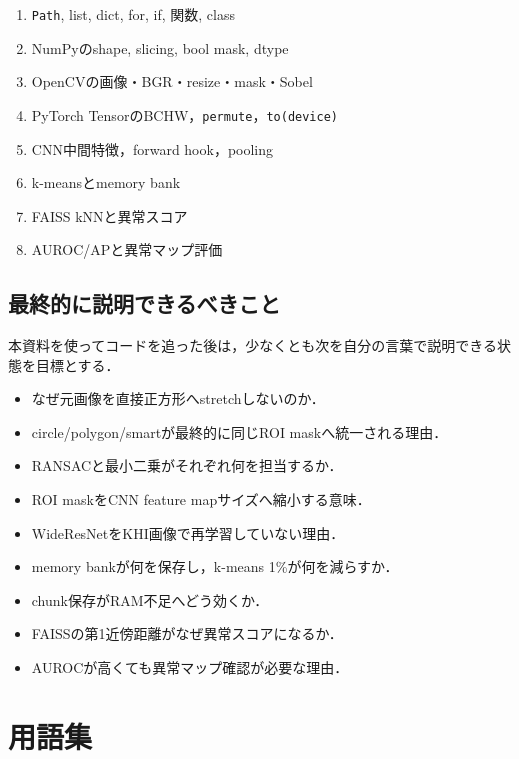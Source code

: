 \documentclass[a4paper,11pt]{ltjsreport}
\begin{document}
\begin{enumerate}
\item \texttt{Path}, list, dict, for, if, 関数, class
\item NumPyのshape, slicing, bool mask, dtype
\item OpenCVの画像・BGR・resize・mask・Sobel
\item PyTorch TensorのBCHW，\texttt{permute}，\texttt{to(device)}
\item CNN中間特徴，forward hook，pooling
\item k-meansとmemory bank
\item FAISS kNNと異常スコア
\item AUROC/APと異常マップ評価
\end{enumerate}

\section{最終的に説明できるべきこと}
本資料を使ってコードを追った後は，少なくとも次を自分の言葉で説明できる状態を目標とする．

\begin{itemize}
\item なぜ元画像を直接正方形へstretchしないのか．
\item circle/polygon/smartが最終的に同じROI maskへ統一される理由．
\item RANSACと最小二乗がそれぞれ何を担当するか．
\item ROI maskをCNN feature mapサイズへ縮小する意味．
\item WideResNetをKHI画像で再学習していない理由．
\item memory bankが何を保存し，k-means 1\%が何を減らすか．
\item chunk保存がRAM不足へどう効くか．
\item FAISSの第1近傍距離がなぜ異常スコアになるか．
\item AUROCが高くても異常マップ確認が必要な理由．
\end{itemize}

\chapter{用語集}
\end{document}
